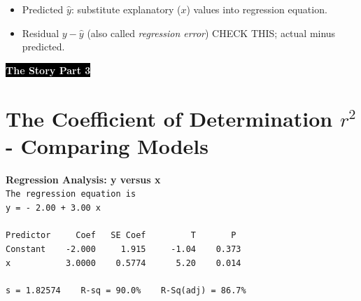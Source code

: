 \documentclass[hidelinks,9pt, oneside]{extarticle}     %
\begin{document}
  \begin{itemize}
    \item Predicted $\hat{y}$: substitute explanatory ($x$) values into regression equation.
    \item Residual $y-\hat{y}$ (also called {\em regression error}) CHECK THIS; actual minus predicted.
  \end{itemize}

%


\newpage


  \colorbox{black}{{\bf \textcolor{white}{\textsf{The Story Part 3}}}}\\


  \section{The Coefficient of Determination $r^2$ - Comparing Models} %
  \label{sub:subsection_name}


    {\bf Regression Analysis: y versus x}\\
    \verb|The regression equation is|\\
    \verb|y = - 2.00 + 3.00 x|\\
    \verb||\\
    \verb|Predictor     Coef   SE Coef         T       P|\\
    \verb|Constant    -2.000     1.915     -1.04    0.373|\\
    \verb|x           3.0000    0.5774      5.20    0.014|\\
    \verb||\\
    \verb|s = 1.82574    R-sq = 90.0%    R-Sq(adj) = 86.7%|
    \verb||\\
\end{document}
